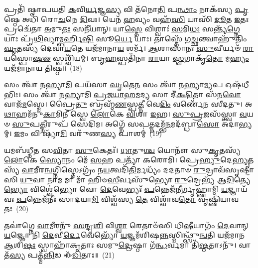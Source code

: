 𑌪𑍍𑌰𑌤𑌿᳴ 𑌷𑍍𑌠𑌾𑌪𑌯𑌤𑌿 \ul{𑌕}\-𑌵𑌿\-\ul{𑌰𑍍𑌯}\-𑌜𑍍𑌞\-\ul{𑌸𑍍𑌯} 𑌵𑌿 𑌤᳴𑌨𑍋\-\ul{𑌤𑌿} 𑌪\-\ul{𑌨𑍍𑌥𑌾𑌂} 𑌨𑌾𑌕᳴𑌸𑍍𑌯 \ul{𑌪𑍃}\-𑌷𑍍𑌠𑍇 𑌅𑌧𑌿᳴ 𑌰𑍋\-\ul{𑌚}\-𑌨𑍇 \ul{𑌦𑌿}\-𑌵𑌃। 𑌯𑍇𑌨᳴ \ul{𑌹}\-𑌵𑍍𑌯𑌂 𑌵𑌹᳴\-\ul{𑌸𑌿} 𑌯𑌾𑌸𑌿᳴ \ul{𑌦𑍂}\-𑌤 \ul{𑌇}\-𑌤𑌃 𑌪𑍍𑌰𑌚𑍇᳴𑌤𑌾 \ul{𑌅}\-𑌮𑍁\-\ul{𑌤𑌃} 𑌸𑌨𑍀᳴𑌯𑌾𑌨𑍍। 𑌯𑌾\-\ul{𑌸𑍍𑌤𑍇} 𑌵𑌿𑌶𑍍𑌵𑌾𑌃॑ \ul{𑌸}\-𑌮𑌿\-\ul{𑌧𑌃} 𑌸𑌨𑍍𑌤𑍍𑌯᳴\-\ul{𑌗𑍍𑌨𑍇} 𑌯𑌾𑌃 𑌪𑍃᳴\-\ul{𑌥𑌿}\-𑌵𑍍𑌯𑌾\-\ul{𑌮𑍍𑌬}\-𑌰𑍍\mbox{}𑌹𑌿\-\ul{𑌷𑌿} 𑌸𑍂\-\ul{𑌰𑍍𑌯𑍇} 𑌯𑌾𑌃। 𑌤𑌾𑌸𑍍𑌤𑍇᳴ 𑌗\-\ul{𑌚𑍍𑌛}\-𑌨𑍍𑌤𑍍𑌵𑌾𑌹𑍁᳴𑌤𑌿𑌂 \ul{𑌘𑍃}\-𑌤𑌸𑍍𑌯᳴ 𑌦𑍇𑌵𑌾\-\ul{𑌯}\-𑌤𑍇 𑌯𑌜᳴𑌮𑌾𑌨𑌾\-\ul{𑌯} 𑌶𑌰𑍍𑌮᳴। \ul{𑌆}\-𑌶𑌾𑌸𑌾᳴𑌨𑌃 \ul{𑌸𑍁}\-𑌵𑍀𑌰𑍍𑌯𑍞᳴ \ul{𑌰𑌾}\-𑌯𑌸𑍍𑌪𑍋\-\ul{𑌷}\-\-\ul{𑍟} 𑌸𑍍𑌵𑌶𑍍𑌵𑌿᳴𑌯𑌮𑍍। 𑌬𑍃\-\ul{𑌹}\-𑌸𑍍𑌪𑌤𑌿᳴𑌨𑌾 \ul{𑌰𑌾}\-𑌯𑌾 \ul{𑌸𑍍𑌵}\-𑌗𑌾𑌕𑍃᳴\-\ul{𑌤𑍋} 𑌮\-\ul{𑌹𑍍𑌯𑌂} 𑌯𑌜᳴𑌮𑌾𑌨𑌾𑌯 𑌤𑌿𑌷𑍍𑌠॥~(18)

{\anuvakamend[{\-\ul{𑌸}\-\-\ul{𑌮𑌾}\-𑌨𑌾\-\ul{𑌨𑌾}\-𑌮𑍋𑌷᳴𑌧𑍀\-\ul{𑌷𑍍𑌵𑍇}\-𑌵 \ul{𑌪}\-𑌶𑍂𑌨𑍍𑌮\-\ul{𑌹𑍍𑌯𑌂} 𑌯𑌜᳴𑌮𑌾\-\ul{𑌨𑌾}\-𑌯𑍈𑌕᳴𑌞𑍍𑌚}]}%

𑌸𑌂 𑌤𑍍𑌵𑌾᳴ 𑌨𑌹𑍍𑌯𑌾\-\ul{𑌮𑌿} 𑌪𑌯᳴𑌸𑌾 \ul{𑌘𑍃}\-𑌤𑍇\-\ul{𑌨} 𑌸𑌂 𑌤𑍍𑌵𑌾᳴ 𑌨𑌹𑍍𑌯𑌾\-\ul{𑌮𑍍𑌯}\-𑌪 𑌓𑌷᳴𑌧𑍀𑌭𑌿𑌃। 𑌸𑌂 𑌤𑍍𑌵𑌾᳴ 𑌨𑌹𑍍𑌯𑌾𑌮𑌿 \ul{𑌪𑍍𑌰}\-𑌜\-\ul{𑌯𑌾}\-𑌹\-\ul{𑌮}\-𑌦𑍍𑌯 𑌸𑌾 𑌦𑍀॑\-\ul{𑌕𑍍𑌷𑌿}\-𑌤𑌾 𑌸᳴𑌨\-\ul{𑌵𑍋} 𑌵𑌾𑌜᳴\-\ul{𑌮}\-𑌸𑍍𑌮𑍇। 𑌪𑍍𑌰𑍈\-\ul{𑌤𑍁} 𑌬𑍍𑌰𑌹𑍍𑌮᳴\-\ul{𑌣}\-𑌸𑍍𑌪\-\ul{𑌤𑍍𑌨𑍀} 𑌵𑍇\-\ul{𑌦𑌿𑌂} 𑌵𑌰𑍍𑌣𑍇᳴𑌨 𑌸𑍀𑌦𑌤𑍁। 𑌅\-\ul{𑌥𑌾}\-𑌹𑌮᳴𑌨𑍁\-\ul{𑌕𑌾}\-𑌮𑌿\-\ul{𑌨𑍀} 𑌸𑍍𑌵𑍇 \ul{𑌲𑍋}\-𑌕𑍇 \ul{𑌵𑌿}\-𑌶𑌾 \ul{𑌇}\-𑌹। \ul{𑌸𑍁}\-\-\ul{𑌪𑍍𑌰}\-𑌜𑌸᳴𑌸𑍍𑌤𑍍𑌵𑌾 \ul{𑌵}\-𑌯𑍞 \ul{𑌸𑍁}\-𑌪\-\ul{𑌤𑍍𑌨𑍀}\-𑌰𑍁𑌪᳴ 𑌸𑍇𑌦𑌿𑌮। 𑌅𑌗𑍍𑌨𑍇᳴ 𑌸𑌪\-\ul{𑌤𑍍𑌨}\-𑌦𑌮𑍍𑌭᳴\-\ul{𑌨}\-𑌮𑌦᳴𑌬𑍍𑌧𑌾\-\ul{𑌸𑍋} 𑌅𑌦𑌾॑𑌭𑍍𑌯𑌮𑍍। \ul{𑌇}\-𑌮𑌂 𑌵𑌿 𑌷𑍍𑌯𑌾᳴\-\ul{𑌮𑌿} 𑌵𑌰𑍁᳴𑌣\-\ul{𑌸𑍍𑌯} 𑌪𑌾𑌶𑌮𑍍॑~(19)

𑌯𑌮𑌬᳴𑌧𑍍𑌨𑍀𑌤 𑌸\-\ul{𑌵𑌿}\-𑌤𑌾 \ul{𑌸𑍁}\-𑌕𑍇𑌤𑌃᳴। \ul{𑌧𑌾}\-𑌤𑍁\-\ul{𑌶𑍍𑌚} 𑌯𑍋𑌨𑍗᳴ 𑌸𑍁\-\ul{𑌕𑍃}\-𑌤𑌸𑍍𑌯᳴ \ul{𑌲𑍋}\-𑌕𑍇 \ul{𑌸𑍍𑌯𑍋}\-𑌨𑌂 𑌮𑍇᳴ \ul{𑌸}\-𑌹 𑌪𑌤𑍍𑌯𑌾᳴ 𑌕𑌰𑍋𑌮𑌿। 𑌪𑍍𑌰𑍇\-\ul{𑌹𑍍𑌯𑍁}\-𑌦𑍇\-\ul{𑌹𑍍𑌯𑍃}\-𑌤𑌸𑍍𑌯᳴ \ul{𑌵𑌾}\-𑌮𑍀𑌰\-\ul{𑌨𑍍𑌵}\-𑌗𑍍𑌨𑌿𑌸𑍍𑌤𑍇\-𑌽𑌗𑍍𑌰𑌂᳴ 𑌨\-\ul{𑌯}\-𑌤𑍍𑌵𑌦𑌿᳴\-\ul{𑌤𑌿}\-𑌰𑍍𑌮𑌧𑍍𑌯𑌂᳴ 𑌦𑌦𑌤𑌾𑍞 \ul{𑌰𑍁}\-𑌦𑍍𑌰𑌾𑌵᳴𑌸𑍃𑌷𑍍𑌟𑌾𑌸𑌿 \ul{𑌯𑍁}\-𑌵𑌾 𑌨𑌾\-\ul{𑌮} 𑌮𑌾 𑌮𑌾᳴ 𑌹𑌿𑍞\-\ul{𑌸𑍀}\-𑌰𑍍𑌵𑌸𑍁᳴𑌭𑍍𑌯𑍋 \ul{𑌰𑍁}\-𑌦𑍍𑌰𑍇𑌭𑍍𑌯᳴ 𑌆\-\ul{𑌦𑌿}\-𑌤𑍍𑌯𑍇\-\ul{𑌭𑍍𑌯𑍋} 𑌵𑌿𑌶𑍍𑌵𑍇॑𑌭𑍍𑌯𑍋 𑌵𑍋 \ul{𑌦𑍇}\-𑌵𑍇𑌭𑍍𑌯𑌃᳴ \ul{𑌪}\-𑌨𑍍𑌨𑍇𑌜᳴𑌨𑍀𑌰𑍍𑌗𑍃𑌹𑍍𑌣𑌾𑌮𑌿 \ul{𑌯}\-𑌜𑍍𑌞𑌾𑌯᳴ 𑌵𑌃 \ul{𑌪}\-𑌨𑍍𑌨𑍇𑌜᳴𑌨𑍀𑌃 𑌸𑌾𑌦𑌯𑌾\-\ul{𑌮𑌿} 𑌵𑌿𑌶𑍍𑌵᳴𑌸𑍍𑌯 \ul{𑌤𑍇} 𑌵𑌿𑌶𑍍𑌵𑌾᳴𑌵\-\ul{𑌤𑍋} 𑌵𑍃𑌷𑍍𑌣𑌿᳴𑌯𑌾𑌵𑌤𑌃~(20)

𑌤𑌵𑌾॑𑌗𑍍𑌨𑍇 \ul{𑌵𑌾}\-𑌮𑍀𑌰𑌨𑍁᳴ \ul{𑌸}\-𑌨𑍍𑌦𑍃\-\ul{𑌶𑌿} 𑌵𑌿\-\ul{𑌶𑍍𑌵𑌾} 𑌰𑍇𑌤𑌾𑍞᳴𑌸𑌿 𑌧𑌿\-\ul{𑌷𑍀}\-𑌯𑌾𑌗𑌂᳴ \ul{𑌦𑍇}\-𑌵𑌾𑌨𑍍 \ul{𑌯}\-𑌜𑍍𑌞𑍋 𑌨𑌿 \ul{𑌦𑍇}\-𑌵𑍀\-\ul{𑌰𑍍𑌦𑍇}\-𑌵𑍇𑌭𑍍𑌯𑍋᳴ \ul{𑌯}\-𑌜𑍍𑌞𑌮᳴𑌶𑌿𑌷\-\ul{𑌨𑍍𑌨}\-𑌸𑍍𑌮𑌿𑌨𑍍𑌥𑍍𑌸𑍁᳴\-\ul{𑌨𑍍𑌵}\-𑌤𑌿 𑌯𑌜᳴𑌮𑌾𑌨 \ul{𑌆}\-𑌶𑌿\-\ul{𑌷𑌃} 𑌸𑍍𑌵𑌾𑌹𑌾᳴𑌕𑍃𑌤𑌾𑌃 𑌸𑌮𑍁\-\ul{𑌦𑍍𑌰𑍇}\-𑌷𑍍𑌠𑌾 𑌗᳴\-\ul{𑌨𑍍𑌧}\-𑌰𑍍𑌵𑌮𑌾 𑌤𑌿᳴\-\ul{𑌷𑍍𑌠}\-𑌤𑌾\-𑌽𑌨𑍁᳴। 𑌵𑌾𑌤᳴\-\ul{𑌸𑍍𑌯} 𑌪𑌤𑍍𑌮᳴\-\ul{𑌨𑍍𑌨𑌿}\-𑌡 𑌈᳴\-\ul{𑌡𑌿}\-𑌤𑌾𑌃॥~(21)

{\anuvakamend[{𑌪𑌾\-\ul{𑌶𑌂} 𑌵𑍃𑌷𑍍𑌣𑌿᳴𑌯𑌾𑌵𑌤\-\ul{𑌸𑍍𑌤𑍍𑌰𑌿}\-\-\ul{𑍞}\-𑌶𑌚𑍍𑌚᳴}]}%

